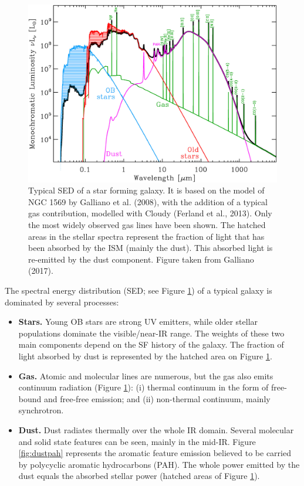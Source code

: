 \documentclass[a4paper,10pt]{article}
\begin{document}
\begin{figure}[h]
    \centering
    \includegraphics[width=14cm]{figures/GalaxySED.jpg}
    \caption{\footnotesize{Typical SED of a star forming galaxy. It is based on the model of NGC 1569 by Galliano et al. (2008), with the addition of a typical gas contribution, modelled with Cloudy (Ferland et al., 2013). Only the most widely observed gas lines have been shown. The hatched areas in the stellar spectra represent the fraction of light that has been absorbed by the ISM (mainly the dust). This absorbed light is re-emitted by the dust component. Figure taken from Galliano (2017).}}
    \label{fig:galaxySED}
\end{figure}

{\noindent}The spectral energy distribution (SED; see Figure \ref{fig:galaxySED}) of a typical galaxy is dominated by several processes:

\begin{itemize}
    \item \textbf{Stars.} Young OB stars are strong UV emitters, while older stellar populations dominate the visible/near-IR range. The weights of these two main components depend on the SF history of the galaxy. The fraction of light absorbed by dust is represented by the hatched area on Figure \ref{fig:galaxySED}.
    \item \textbf{Gas.} Atomic and molecular lines are numerous, but the gas also emits continuum radiation (Figure \ref{fig:galaxySED}): (i) thermal continuum in the form of free-bound and free-free emission; and (ii) non-thermal continuum, mainly synchrotron.
    \item \textbf{Dust.} Dust radiates thermally over the whole IR domain. Several molecular and solid state features can be seen, mainly in the mid-IR. Figure \ref{fig:dustpah} represents the aromatic feature emission believed to be carried by polycyclic aromatic hydrocarbons (PAH). The whole power emitted by the dust equals the absorbed stellar power (hatched areas of Figure \ref{fig:galaxySED}).
\end{itemize}
\end{document}

